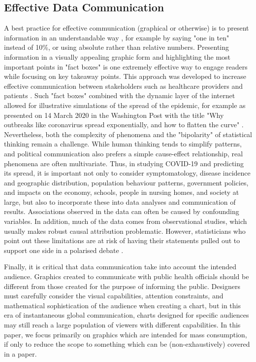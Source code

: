 \documentclass[article]{jdssv}\usepackage[]{graphicx}\usepackage[]{color}
\begin{document}
\subsection{Effective Data Communication}
A best practice for effective communication (graphical or otherwise) is to present information in an understandable way \citep{gigerenzerHelpingDoctorsPatients2007,gigerenzerWhatAreNatural2011}, for example by saying "one in ten" instead of 10\%, or using absolute rather than relative numbers. 
Presenting information in a visually appealing graphic form and highlighting the most important points in "fact boxes" is one extremely effective way to engage readers while focusing on key takeaway points. 
This approach was developed to increase effective communication between stakeholders such as healthcare providers and patients \citep{FaktenboxenZurMRNASchutzimpfung}. 
Such "fact boxes" combined with the dynamic layer of the internet allowed for illustrative simulations of the spread of the epidemic, for example as presented on 14 March 2020 in the Washington Post with the title "Why outbreaks like coronavirus spread exponentially, and how to flatten the curve" \citep{stevensTheseSimulationsShow2020}.  Nevertheless, both the complexity of phenomena and the "bipolarity" of statistical thinking remain a challenge. 
While human thinking tends to simplify patterns, and political communication also prefers a simple cause-effect relationship, real phenomena are often multivariate. 
Thus, in studying COVID-19 and predicting its spread, it is important not only to consider symptomatology, disease incidence and geographic distribution, population behaviour patterns, government policies, and impacts on the economy, schools, people in nursing homes, and society at large, but also to incorporate these into data analyses and communication of results. 
Associations observed in the data can often be caused by confounding variables. 
In addition, much of the data comes from observational studies, which usually makes robust causal attribution problematic. 
However, statisticians who point out these limitations are at risk of having their statements pulled out to support one side in a polarised debate \citep{McConway2021}.

Finally, it is critical that data communication take into account the intended audience. Graphics created to communicate with public health officials should be different from those created for the purpose of informing the public. Designers must carefully consider the visual capabilities, attention constraints, and mathematical sophistication of the audience when creating a chart, but in this era of instantaneous global communication, charts designed for specific audiences may still reach a large population of viewers with different capabilities. In this paper, we focus primarily on graphics which are intended for mass consumption, if only to reduce the scope to something which can be (non-exhaustively) covered in a paper.
\end{document}
